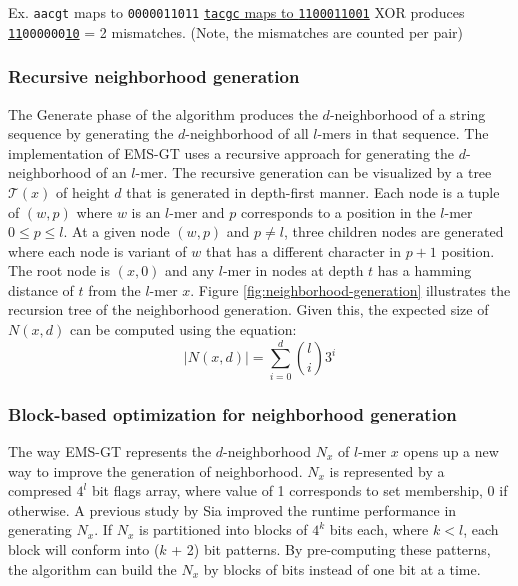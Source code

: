 	{\small Ex.	\texttt{aacgt} maps to \texttt{0000011011} \newline
		\vspace*{2pt}\hspace*{53pt} \underline{\texttt{tacgc} maps to \texttt{1100011001}} \newline
		\hspace*{55pt}	XOR produces \texttt{\uline{11}000000\uline{10}} = 2 mismatches.} \newline
		\hspace*{53pt} (Note, the mismatches are counted per pair)


	\subsubsection{Recursive neighborhood generation}
	The Generate phase of the algorithm produces the $d$-neighborhood of a string sequence by generating the $d$-neighborhood of all $l$-mers in that sequence. The implementation of EMS-GT uses a recursive approach for generating the $d$-neighborhood of an $l$-mer. The recursive generation can be visualized by a tree $\mathcal{T}(x)$ of height $d$ that is generated in depth-first manner. Each node is a tuple of $(w, p)$ where $w$ is an $l$-mer and $p$ corresponds to a position in the $l$-mer $0 \leq p \leq l$. At a given node $(w, p)$ and $p \neq l$, three children nodes are generated where each node is variant of $w$ that has a different character in $p + 1$ position. The root node is $(x, 0)$ and any $l$-mer in nodes at depth $t$ has a hamming distance of $t$ from the $l$-mer $x$. Figure \ref{fig:neighborhood-generation} illustrates the recursion tree of the neighborhood generation. Given this, the expected size of $N(x, d)$ can be computed using the equation: \newline
	\begin{equation}
		|N(x,d)| = \sum_{i=0}^d \binom{l}{i} 3^{i}
	\end{equation}

	

	\subsubsection{Block-based optimization for neighborhood generation}
	The way EMS-GT represents the $d$-neighborhood $N_x$ of $l$-mer $x$ opens up a new way to improve the generation of neighborhood. $N_x$ is represented by a compresed $4^l$ bit flags array, where value of 1 corresponds to set membership, 0 if otherwise.  A previous study by Sia \cite{sia2015} improved the runtime performance in generating $N_x$. If $N_x$ is partitioned into blocks of $4^k$ bits each, where $k < l$, each block will conform into ($k$ + 2) bit patterns. By pre-computing these patterns, the algorithm can build the $N_x$ by blocks of bits instead of one bit at a time.


